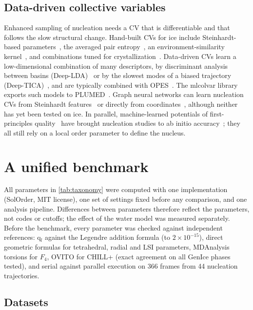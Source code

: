 \documentclass[11pt,a4paper]{article}
\begin{document}
\subsection{Data-driven collective variables}
Enhanced sampling of nucleation needs a CV that is differentiable and that
follows the slow structural change. Hand-built CVs for ice include
Steinhardt-based parameters~\cite{Quigley2008,Reinhardt2012}, the averaged
pair entropy~\cite{Piaggi2017b}, an environment-similarity
kernel~\cite{Piaggi2020}, and combinations tuned for
crystallization~\cite{Zhang2019,Niu2019}. Data-driven CVs learn a
low-dimensional combination of many descriptors, by discriminant analysis
between basins (Deep-LDA)~\cite{Bonati2020} or by the slowest modes of a
biased trajectory (Deep-TICA)~\cite{Bonati2021}, and are typically combined
with OPES~\cite{Invernizzi2020}. The mlcolvar library exports such models to
PLUMED~\cite{Bonati2023}. Graph neural networks can learn nucleation CVs from
Steinhardt features~\cite{Dietrich2024} or directly from
coordinates~\cite{Zhang2024}, although neither has yet been tested on ice. In
parallel, machine-learned potentials of first-principles
quality~\cite{Zhang2018,Babin2013,Babin2014,Medders2014,Schran2021} have
brought nucleation studies to ab initio accuracy~\cite{Cheng2018,Niu2020,
Piaggi2022,Piaggi2024}; they all still rely on a local order parameter to
define the nucleus.

\section{A unified benchmark}\label{sec:benchmark}
All parameters in \cref{tab:taxonomy} were computed with one implementation
(SolOrder, MIT license), one set of settings fixed before any comparison, and
one analysis pipeline. Differences between parameters therefore reflect the
parameters, not codes or cutoffs; the effect of the water model was measured
separately. Before the benchmark, every parameter was checked against
independent references: q$_l$ against the Legendre addition formula (to
$2\times10^{-15}$), direct geometric formulas for tetrahedral, radial and LSI
parameters, MDAnalysis torsions for $F_4$, OVITO for CHILL+ (exact agreement
on all GenIce phases tested), and serial against parallel execution on 366
frames from 44 nucleation trajectories.

\subsection{Datasets}\label{sec:datasets}
\end{document}
